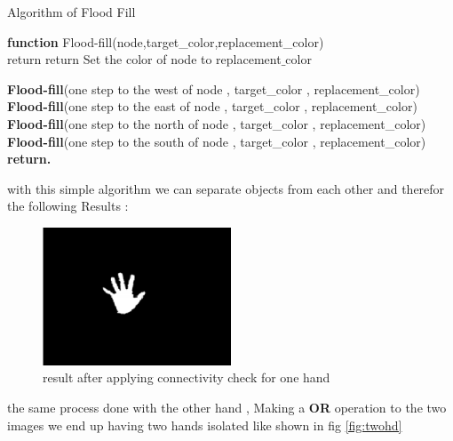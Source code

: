\begin{algorithm}[H]

\caption{Algorithm of Flood Fill }
\textbf{function}  Flood-fill(node,target\_color,replacement\_color)\\ 
    {
     return
    }
    {
     return
    }
Set the color of node to replacement$\_$color 

\textbf{Flood-fill}(one step to the west of node , target\_color , replacement\_color)\\
\textbf{Flood-fill}(one step to the east of node , target\_color , replacement\_color)\\
\textbf{Flood-fill}(one step to the north of node , target\_color , replacement\_color)\\
\textbf{Flood-fill}(one step to the south of node , target\_color , replacement\_color)\\
\textbf{return.} 
\end{algorithm}
with this simple algorithm we can separate objects from each other and therefor the following  Results : 
 
 \begin{figure}[H]
\centering
\includegraphics[width=0.5\textwidth]{img/finalresult.png}
\caption{result after applying connectivity check for one hand  }
\label{fig:cam11}
\end{figure}

the same process done with the other hand , Making a \textbf{OR } operation to the two images we end up having two hands isolated like shown in fig \ref{fig:twohd}

